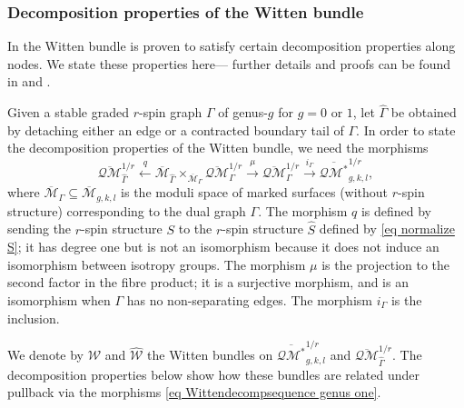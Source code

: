\documentclass[11pt]{amsart}
\theoremstyle{definition}
\theoremstyle{remark}
\newcommand{\oQMb}{{\overline{\mathcal{QM}}}}
\newcommand{\<}{\left<}
\renewcommand{\>}{\right>}
\numberwithin{equation}{section}
\def\Mbar{{\overline{\mathcal M}}}
\begin{document}
\subsubsection{Decomposition properties of the Witten bundle}\label{subsec decomp}
In \cite{BCT1,TZ1} the Witten bundle is proven to satisfy certain decomposition properties along nodes.  We state these %
properties here--- further %
details and proofs can be found in \cite{TZ1} and \cite[\S 4.2]{BCT1}.



Given a stable graded $r$-spin graph $\Gamma$ of genus-$g$ for $g=0$ or $1$, let $\widehat{\Gamma}$ be obtained by detaching either an edge or a contracted boundary tail of $\Gamma$.  In order to state the decomposition properties of the Witten bundle, we need the morphisms
\begin{equation}
\label{eq Wittendecompsequence genus one}
\oQMb_{\widehat{\Gamma}}^{1/r} \xleftarrow{q} \Mbar_{\widehat{\Gamma}} \times_{\Mbar_{\Gamma}} \oQMb_{\Gamma}^{1/r} \xrightarrow{\mu} \oQMb_{\Gamma}^{1/r} \xrightarrow{i_{\Gamma}} \overline{\mathcal{QM}^*}_{g,k,l}^{1/r},
\end{equation}
where $\Mbar_{\Gamma} \subseteq \Mbar_{g,k,l}$ is the moduli space of marked surfaces (without $r$-spin structure) corresponding to the dual graph $\Gamma$.  The morphism $q$ is defined by sending the $r$-spin structure $S$ to the $r$-spin structure $\widehat{S}$ defined by \eqref{eq normalize S}; it has degree one but is not an isomorphism because it does not induce an isomorphism between isotropy groups.  The morphism $\mu$ is the projection to the second factor in the fibre product; it is a surjective morphism, and is an isomorphism when $\Gamma$ has no non-separating edges.  The morphism $i_{\Gamma}$ is the inclusion.

We denote by ${\mathcal{W}}$ and $\widehat{{\mathcal{W}}}$ the Witten bundles on $\overline{\mathcal{QM}^*}_{g,k,l}^{1/r}$ and %
$\oQMb_{\widehat{\Gamma}}^{1/r}$. The decomposition %
properties below show how these bundles are related under pullback via the morphisms \eqref{eq Wittendecompsequence genus one}.  
\end{document}
